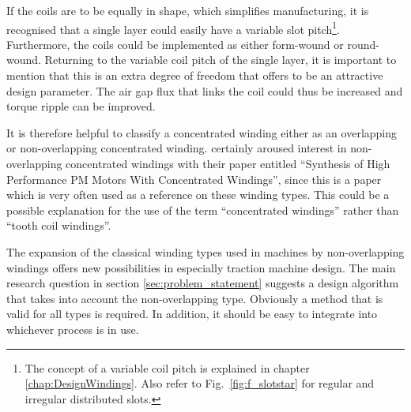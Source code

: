 If the coils are to be equally in shape, which simplifies manufacturing, it is recognised that a single layer could easily have a variable slot pitch\footnote{The concept of a variable coil pitch is explained in chapter \ref{chap:DesignWindings}. Also refer to Fig.~\ref{fig:f_slotstar} for regular and irregular distributed slots.}. Furthermore, the coils could be implemented as either form-wound or round-wound. Returning to the variable coil pitch of the single layer, it is important to mention that this is an extra degree of freedom that offers to be an attractive design parameter. The air gap flux that links the coil could thus be increased and torque ripple can be improved. 

It is therefore helpful to classify a concentrated winding either as an overlapping or non-overlapping concentrated winding. \cite{REF-01045} certainly aroused interest in non-overlapping concentrated windings with their paper entitled ``Synthesis of High Performance PM Motors With Concentrated Windings'', since this is a paper which is very often used as a reference on these winding types. This could be a possible explanation for the use of the term ``concentrated windings'' rather than ``tooth coil windings''.

The expansion of the classical winding types used in machines by non-overlapping windings offers new possibilities in especially traction machine design. The main research question in section \ref{sec:problem_statement} suggests a design algorithm that takes into account the non-overlapping type. Obviously a method that is valid for all types is required. In addition, it should be easy to integrate into whichever process is in use. 

